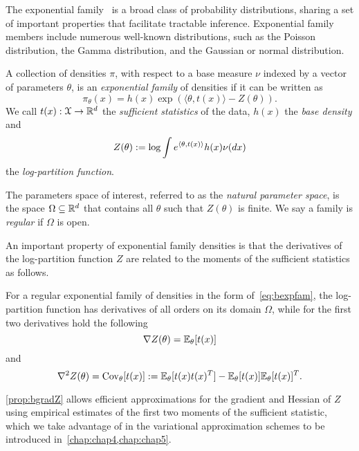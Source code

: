 The exponential family~\citep{wainwright08} is a broad class of probability distributions, sharing a set of important properties that facilitate tractable inference. Exponential family members include numerous well-known distributions, such as the Poisson distribution, the Gamma distribution, and the Gaussian or normal distribution. 

\begin{ndefn} \label{def:bexpfam}
A collection of densities $\pi$, with respect to a base measure $\nu$ indexed by a vector of parameters $\theta$, is an \emph{exponential family} of densities if it can be written as
\[
\pi_{\theta}(x) = h(x) \exp\left( \langle \theta, t(x) \rangle - Z(\theta) \right).
\label{eq:bexpfam}
\]
We call $t(x): \mathcal{X} \rightarrow \mathbb{R}^{d}$ the \emph{sufficient statistics} of the data, $h(x)$ the \emph{base density} and 
\[
Z(\theta):= \log \int e^{\langle \theta, t(x) \rangle } h(x) \nu(dx)
\label{eq:b-logpartition}
\]
the \emph{log-partition function}.
\end{ndefn}

The parameters space of interest, referred to as the \emph{natural parameter space}, is the space $\Omega \subseteq \mathbb{R}^d $ that contains all $\theta$ such that $Z(\theta)$ is finite. We say a family is \emph{regular} if $\Omega$ is open.

An important property of exponential family densities is that the derivatives of the log-partition function $Z$ are related to the moments of the sufficient statistics as follows.

\begin{nprop} \label{prop:bgradZ}
For a regular exponential family of densities in the form of~\cref{eq:bexpfam}, the log-partition function has derivatives of all orders on its domain $\Omega$, while for the first two derivatives hold the following
\[
\nabla Z(\theta) = \mathbb{E}_{\theta}[t(x)]
\label{eq:bgradZ}
\] 	
and 
\[
\nabla^2Z(\theta) = \operatorname{Cov}_{\theta}[t(x)] := \mathbb{E}_{\theta}[t(x)t(x)^T] - \mathbb{E}_{\theta}[t(x)]\mathbb{E}_{\theta}[t(x)]^T.
\label{eq:bhessZ}
\]
\end{nprop}

\cref{prop:bgradZ} allows efficient approximations for the gradient and Hessian of $ Z $ using empirical estimates of the first two moments of the sufficient statistic, which we take advantage of in the variational approximation schemes to be introduced in~\cref{chap:chap4,chap:chap5}.

